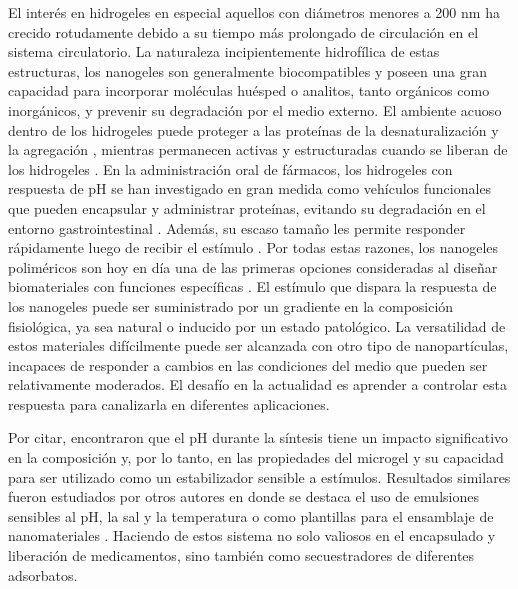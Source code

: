 El inter\'es en hidrogeles en especial aquellos con di\'ametros menores a 200 nm ha crecido rotudamente debido a su tiempo m\'as prolongado de circulaci\'on en el sistema circulatorio. La naturaleza incipientemente hidrof\'ilica de estas estructuras, los nanogeles son generalmente biocompatibles y poseen una gran capacidad para incorporar mol\'eculas hu\'esped o analitos, tanto org\'anicos como inorg\'anicos, y prevenir su degradaci\'on por el medio externo. El ambiente acuoso dentro de los hidrogeles puede proteger a las prote\'inas de la desnaturalizaci\'on y la agregaci\'on \cite{asayama2008comparison,sawada2010nano,beierle2014polymer}, mientras permanecen activas y estructuradas cuando se liberan de los hidrogeles \cite{vermonden2012hydrogels}. En la administraci\'on oral de f\'armacos, los hidrogeles con respuesta de pH se han investigado en gran medida como veh\'iculos funcionales que pueden encapsular y administrar prote\'inas, evitando su degradaci\'on en el entorno gastrointestinal \cite{malmsten2010biomacromolecules,renukuntla2013approaches,koetting2014ph}.
Adem\'as, su escaso tama\~no les permite responder r\'apidamente luego de recibir el est\'imulo \cite{tanaka1979kinetics} . Por todas estas razones, los nanogeles polim\'ericos son hoy en d\'ia una de las primeras opciones consideradas al dise\~nar biomateriales con funciones espec\'ificas \cite{soni2016nanogels, sabir2019polymeric}. El est\'imulo que dispara la respuesta de los nanogeles puede ser suministrado por un gradiente en la composici\'on fisiol\'ogica, ya sea natural o inducido por un estado patol\'ogico. La versatilidad de estos materiales dif\'icilmente puede ser alcanzada con otro tipo de nanopart\'iculas, incapaces de responder a cambios en las condiciones del medio que pueden ser relativamente moderados. El desaf\'io en la actualidad es aprender a controlar esta respuesta para canalizarla en diferentes aplicaciones.


Por citar, \citet{Brugger2008} encontraron que el pH durante la s\'intesis tiene un impacto significativo en la composici\'on y, por lo tanto, en las propiedades del microgel y su capacidad para ser utilizado como un estabilizador sensible a est\'imulos.
Resultados similares fueron estudiados por otros autores en donde se destaca el uso de emulsiones sensibles al pH, la sal y la temperatura  \cite{Ngai2005,Ngai2006, Schmidt2011} o como plantillas para el ensamblaje de nanomateriales \cite{Wong2009}.
Haciendo de estos sistema no solo valiosos en el encapsulado y liberaci\'on de medicamentos, sino también como secuestradores de diferentes adsorbatos.

